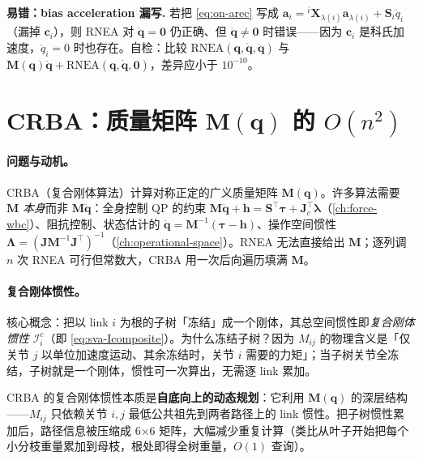 \begin{note}
\textbf{易错：bias acceleration 漏写.}\;
若把 \cref{eq:on-arec} 写成 $\mathbf a_i={}^i\mathbf X_{\lambda(i)}\mathbf a_{\lambda(i)}+\mathbf S_i\ddot q_i$（漏掉 $\mathbf c_i$），则 RNEA 对 $\dot{\mathbf q}=\mathbf 0$ 仍正确、但 $\dot{\mathbf q}\neq\mathbf 0$ 时错误——因为 $\mathbf c_i$ 是科氏加速度，$\ddot q_i=0$ 时也存在。自检：比较 $\mathrm{RNEA}(\mathbf q,\dot{\mathbf q},\ddot{\mathbf q})$ 与 $\mathbf M(\mathbf q)\ddot{\mathbf q}+\mathrm{RNEA}(\mathbf q,\dot{\mathbf q},\mathbf 0)$，差异应小于 $10^{-10}$。
\end{note}

\section{CRBA：质量矩阵 \texorpdfstring{$\mathbf M(\mathbf q)$}{M(q)} 的 \texorpdfstring{$O(n^2)$}{O(n^2)}}
\label{sec:on-crba}

\paragraph{问题与动机。}
CRBA（复合刚体算法）计算对称正定的广义质量矩阵 $\mathbf M(\mathbf q)$。许多算法需要 $\mathbf M$ \emph{本身}而非 $\mathbf M\ddot{\mathbf q}$：全身控制 QP 的约束 $\mathbf M\ddot{\mathbf q}+\mathbf h=\mathbf S^\top\boldsymbol\tau+\mathbf J_c^\top\boldsymbol\lambda$（\cref{ch:force-wbc}）、阻抗控制、状态估计的 $\ddot{\mathbf q}=\mathbf M^{-1}(\boldsymbol\tau-\mathbf h)$、操作空间惯性 $\boldsymbol\Lambda=(\mathbf J\mathbf M^{-1}\mathbf J^\top)^{-1}$（\cref{ch:operational-space}）。RNEA 无法直接给出 $\mathbf M$；逐列调 $n$ 次 RNEA 可行但常数大，CRBA 用一次后向遍历填满 $\mathbf M$。

\paragraph{复合刚体惯性。}
核心概念：把以 link $i$ 为根的子树「冻结」成一个刚体，其总空间惯性即\emph{复合刚体惯性} $\mathcal I_i^c$（即 \cref{eq:sva-Icomposite}）。为什么冻结子树？因为 $M_{ij}$ 的物理含义是「仅关节 $j$ 以单位加速度运动、其余冻结时，关节 $i$ 需要的力矩」；当子树关节全冻结，子树就是一个刚体，惯性可一次算出，无需逐 link 累加。

\begin{insight}
CRBA 的复合刚体惯性本质是\textbf{自底向上的动态规划}：它利用 $\mathbf M(\mathbf q)$ 的深层结构——$M_{ij}$ 只依赖关节 $i,j$ 最低公共祖先到两者路径上的 link 惯性。把子树惯性累加后，路径信息被压缩成 6×6 矩阵，大幅减少重复计算（类比从叶子开始把每个小分枝重量累加到母枝，根处即得全树重量，$O(1)$ 查询）。
\end{insight}

